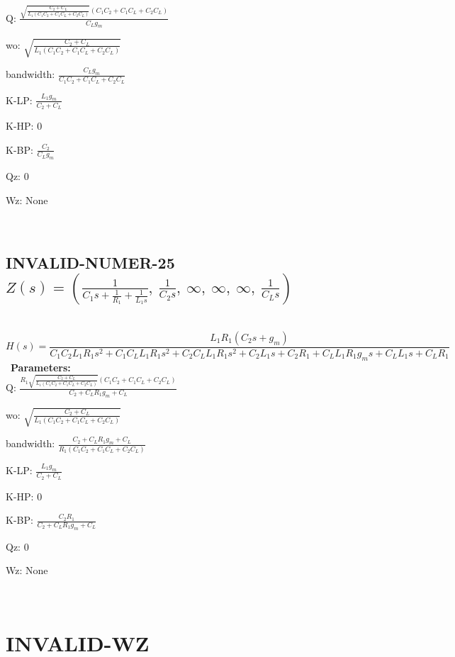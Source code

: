 \documentclass{article}
\begin{document}
Q: $\frac{\sqrt{\frac{C_{2} + C_{L}}{L_{1} \left(C_{1} C_{2} + C_{1} C_{L} + C_{2} C_{L}\right)}} \left(C_{1} C_{2} + C_{1} C_{L} + C_{2} C_{L}\right)}{C_{L} g_{m}}$\ 

wo: $\sqrt{\frac{C_{2} + C_{L}}{L_{1} \left(C_{1} C_{2} + C_{1} C_{L} + C_{2} C_{L}\right)}}$\ 

bandwidth: $\frac{C_{L} g_{m}}{C_{1} C_{2} + C_{1} C_{L} + C_{2} C_{L}}$\ 

K-LP: $\frac{L_{1} g_{m}}{C_{2} + C_{L}}$\ 

K-HP: $0$\ 

K-BP: $\frac{C_{2}}{C_{L} g_{m}}$\ 

Qz: $0$\ 

Wz: $\text{None}$\ 

\ 

\subsection{INVALID-NUMER-25 $Z(s) = \left( \frac{1}{C_{1} s + \frac{1}{R_{1}} + \frac{1}{L_{1} s}}, \  \frac{1}{C_{2} s}, \  \infty, \  \infty, \  \infty, \  \frac{1}{C_{L} s}\right)$ } \ 
\textbf{\[H(s) = \frac{L_{1} R_{1} \left(C_{2} s + g_{m}\right)}{C_{1} C_{2} L_{1} R_{1} s^{2} + C_{1} C_{L} L_{1} R_{1} s^{2} + C_{2} C_{L} L_{1} R_{1} s^{2} + C_{2} L_{1} s + C_{2} R_{1} + C_{L} L_{1} R_{1} g_{m} s + C_{L} L_{1} s + C_{L} R_{1}}\] } \ 
\textbf{Parameters:}\\ 

Q: $\frac{R_{1} \sqrt{\frac{C_{2} + C_{L}}{L_{1} \left(C_{1} C_{2} + C_{1} C_{L} + C_{2} C_{L}\right)}} \left(C_{1} C_{2} + C_{1} C_{L} + C_{2} C_{L}\right)}{C_{2} + C_{L} R_{1} g_{m} + C_{L}}$\ 

wo: $\sqrt{\frac{C_{2} + C_{L}}{L_{1} \left(C_{1} C_{2} + C_{1} C_{L} + C_{2} C_{L}\right)}}$\ 

bandwidth: $\frac{C_{2} + C_{L} R_{1} g_{m} + C_{L}}{R_{1} \left(C_{1} C_{2} + C_{1} C_{L} + C_{2} C_{L}\right)}$\ 

K-LP: $\frac{L_{1} g_{m}}{C_{2} + C_{L}}$\ 

K-HP: $0$\ 

K-BP: $\frac{C_{2} R_{1}}{C_{2} + C_{L} R_{1} g_{m} + C_{L}}$\ 

Qz: $0$\ 

Wz: $\text{None}$\ 

\ 

\section{INVALID-WZ}\ 
\end{document}
